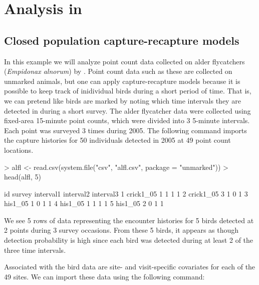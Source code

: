 \documentclass[a4paper]{article}
\renewenvironment{Schunk}{\vspace{\topsep}}{\vspace{\topsep}}
\begin{document}
\section*{Analysis in }




\subsection*{Closed population capture-recapture models}


In this example we will analyze point count data collected on alder
flycatchers (\emph{Empidonax alnorum}) by
\citet{chandler_etal:2009}. Point count data such as these are
collected on unmarked animals, but one can apply
capture-recapture models because it is possible to keep track of
inidividual birds during a short period of time. That is, we can
pretend like birds are marked by noting which time intervals they are
detected in during a short survey. The alder flycatcher data were
collected using fixed-area 15-minute point counts, which were divided
into 3
5-minute intervals. Each point was surveyed 3 times during 2005.
The following command imports the
capture histories for 50 individuals detected in 2005 at 49 point
count locations.

\vspace{3cm}

\begin{Schunk}
\begin{Sinput}
> alfl <- read.csv(system.file("csv", "alfl.csv", package = "unmarked"))
> head(alfl, 5)
\end{Sinput}
\begin{Soutput}
         id survey interval1 interval2 interval3
1 crick1_05      1         1         1         1
2 crick1_05      3         1         0         1
3   his1_05      1         0         1         1
4   his1_05      1         1         1         1
5   his1_05      2         0         1         1
\end{Soutput}
\end{Schunk}

We see 5 rows of data representing the encounter histories for 5 birds
detected at 2 points during 3 survey occasions. From these 5 birds, it appears as though
detection probability is high since each bird was detected during at
least 2 of the three time intervals.

Associated with the bird data are site- and visit-specific covariates
for each of the 49 sites. We can import these data using the following
command:
\end{document}
